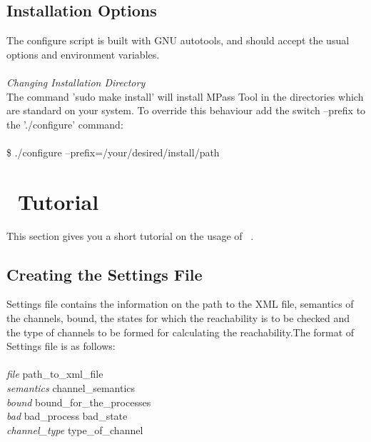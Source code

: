 \subsection{Installation Options}

The configure script is built with GNU autotools, and should accept the usual
options and environment variables.
\\
\\
\emph{Changing Installation Directory} 
\\
The command ’sudo make install’ will install MPass Tool in the directories which are standard on your system. To override this behaviour add the switch
--prefix to the ’./configure’ command:
\\
\\
\hspace*{5mm}\$ ./configure --prefix=/your/desired/install/path

\section{ \MPass\ Tutorial}
This section gives you a short tutorial on the usage of \MPass\ .
\subsection{ Creating the Settings File}
Settings file contains the information on the path to the XML file, semantics of the channels, bound, the states for 
which the reachability is to be checked and the type of channels to be formed for calculating the reachability.The format of Settings file is as follows:
\\
\\
\hspace*{16mm}\emph{file} \hspace*{19mm}     path\_to\_xml\_file
\\
\hspace*{15mm}\emph{semantics} \hspace*{10mm}    channel\_semantics
\\
\hspace*{15mm}\emph{bound} \hspace*{15mm} bound\_for\_the\_processes
\\
\hspace*{15mm}\emph{bad}   \hspace*{19mm}   bad\_process   bad\_state
\\
\hspace*{15mm}\emph{channel\_type}  \hspace*{6mm}   type\_of\_channel
\\\\

